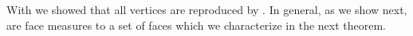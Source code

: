 




With  we showed that all vertices are reproduced by \HardLogicNetworks{}.
In general, as we show next, \HardLogicNetworks{} are face measures to a set of faces which we characterize in the next theorem.

